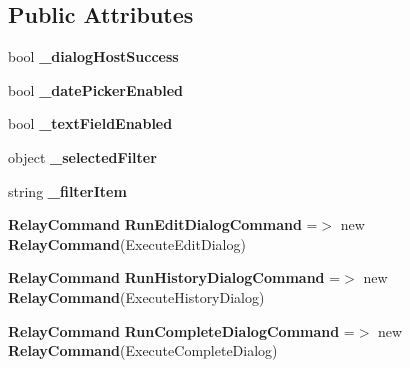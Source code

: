 \subsection*{Public Attributes}
\begin{DoxyCompactItemize}
\item 
bool \textbf{ \+\_\+dialog\+Host\+Success}
\item 
bool \textbf{ \+\_\+date\+Picker\+Enabled}
\item 
bool \textbf{ \+\_\+text\+Field\+Enabled}
\item 
object \textbf{ \+\_\+selected\+Filter}
\item 
string \textbf{ \+\_\+filter\+Item}
\item 
\textbf{ Relay\+Command} \textbf{ Run\+Edit\+Dialog\+Command} =$>$ new \textbf{ Relay\+Command}(Execute\+Edit\+Dialog)
\item 
\textbf{ Relay\+Command} \textbf{ Run\+History\+Dialog\+Command} =$>$ new \textbf{ Relay\+Command}(Execute\+History\+Dialog)
\item 
\textbf{ Relay\+Command} \textbf{ Run\+Complete\+Dialog\+Command} =$>$ new \textbf{ Relay\+Command}(Execute\+Complete\+Dialog)
\end{DoxyCompactItemize}
